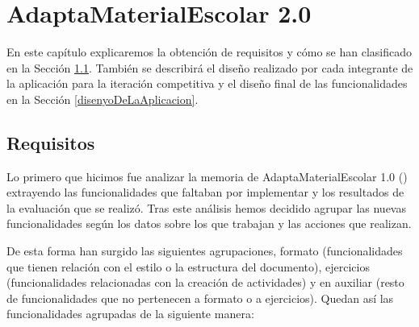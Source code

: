 \chapter{AdaptaMaterialEscolar 2.0}
\label{cap:AdaptaMaterialEscolar2.0}
En este capítulo explicaremos la obtención de requisitos y cómo se han clasificado en la Sección \ref{cap:requisitos}. También se describirá el diseño realizado por cada integrante de la aplicación para la iteración competitiva y el diseño final de las funcionalidades en la Sección \ref{disenyoDeLaAplicacion}.


\section{Requisitos}
\label{cap:requisitos}

Lo primero que hicimos fue analizar la memoria de AdaptaMaterialEscolar 1.0 (\cite*{AdaptaMaterialEscolar1.0}) extrayendo las funcionalidades que faltaban por implementar y los resultados de la evaluación que se realizó. Tras este análisis hemos decidido agrupar las nuevas funcionalidades según los datos sobre los que trabajan y las acciones que realizan.

De esta forma han surgido las siguientes agrupaciones, formato (funcionalidades que tienen relación con el estilo o la estructura del documento), ejercicios (funcionalidades relacionadas con la creación de actividades) y en auxiliar (resto de funcionalidades que no pertenecen a formato o a ejercicios). Quedan así las funcionalidades agrupadas de la siguiente manera:
\\

